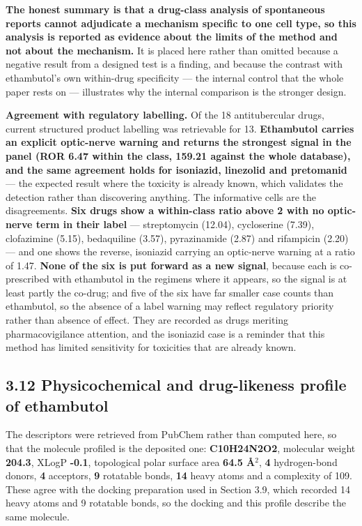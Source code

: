 \documentclass[utf8]{FrontiersinVancouver}
\begin{document}
\textbf{The honest summary is that a drug-class analysis of spontaneous reports cannot adjudicate a mechanism specific to one cell type, so this analysis is reported as evidence about the limits of the method and not about the mechanism.} It is placed here rather than omitted because a negative result from a designed test is a finding, and because the contrast with ethambutol's own within-drug specificity --- the internal control that the whole paper rests on --- illustrates why the internal comparison is the stronger design.

\textbf{Agreement with regulatory labelling.} Of the 18 antitubercular drugs, current structured product labelling was retrievable for 13. \textbf{Ethambutol carries an explicit optic-nerve warning and returns the strongest signal in the panel (ROR 6.47 within the class, 159.21 against the whole database), and the same agreement holds for isoniazid, linezolid and pretomanid} --- the expected result where the toxicity is already known, which validates the detection rather than discovering anything. The informative cells are the disagreements. \textbf{Six drugs show a within-class ratio above 2 with no optic-nerve term in their label} --- streptomycin (12.04), cycloserine (7.39), clofazimine (5.15), bedaquiline (3.57), pyrazinamide (2.87) and rifampicin (2.20) --- and one shows the reverse, isoniazid carrying an optic-nerve warning at a ratio of 1.47. \textbf{None of the six is put forward as a new signal}, because each is co-prescribed with ethambutol in the regimens where it appears, so the signal is at least partly the co-drug; and five of the six have far smaller case counts than ethambutol, so the absence of a label warning may reflect regulatory priority rather than absence of effect. They are recorded as drugs meriting pharmacovigilance attention, and the isoniazid case is a reminder that this method has limited sensitivity for toxicities that are already known.

\subsection{3.12 Physicochemical and drug-likeness profile of ethambutol}

The descriptors were retrieved from PubChem rather than computed here, so that the molecule profiled is the deposited one: \textbf{C10H24N2O2}, molecular weight \textbf{204.3}, XLogP \textbf{-0.1}, topological polar surface area \textbf{64.5 \AA{}$^{2}$}, \textbf{4} hydrogen-bond donors, \textbf{4} acceptors, \textbf{9} rotatable bonds, \textbf{14} heavy atoms and a complexity of 109. These agree with the docking preparation used in Section 3.9, which recorded 14 heavy atoms and 9 rotatable bonds, so the docking and this profile describe the same molecule.
\end{document}
